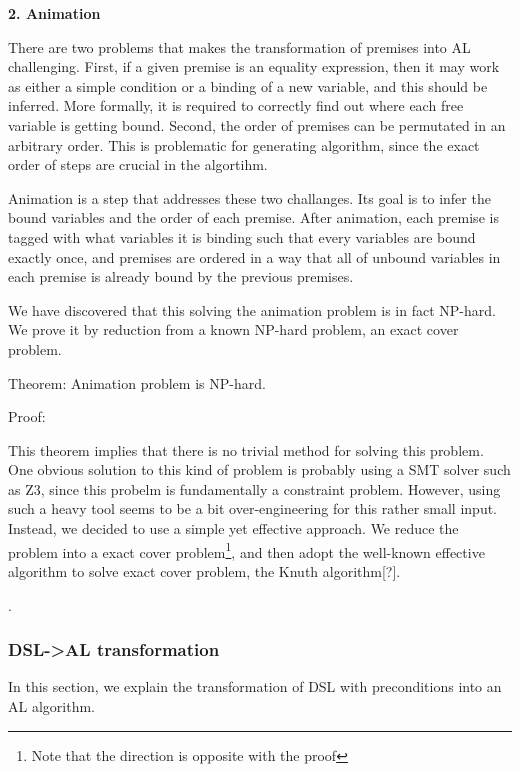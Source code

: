 

\textbf{2. Animation}

There are two problems that makes the transformation of premises into AL challenging.
First, if a given premise is an equality expression, then it may work as either a simple condition or
a binding of a new variable, and this should be inferred. More formally, it is required to
correctly find out where each free variable is getting bound. Second, the order
of premises can be permutated in an arbitrary order. This is problematic for
generating algorithm, since the exact order of steps are crucial in the algortihm.

Animation is a step that addresses these two challanges. Its goal is to infer
the bound variables and the order of each premise.
After animation, each premise is tagged with what variables it is binding
such that every variables are bound exactly once, and premises are ordered in a way that
all of unbound variables in each premise is already bound by the previous premises.

We have discovered that this solving the animation problem is in fact NP-hard.
We prove it by reduction from a known NP-hard problem, an exact cover problem.

Theorem: Animation problem is NP-hard.

Proof: 

This theorem implies that there is no trivial method for solving this problem.
One obvious solution to this kind of problem is probably using a SMT solver such as Z3, since
this probelm is fundamentally a constraint problem.
However, using such a heavy tool seems to be a bit over-engineering for this rather small input.
Instead, we decided to use a simple yet effective approach.
We reduce the problem into a exact cover problem\footnote{Note that the direction is opposite with
the proof}, and then adopt the well-known effective algorithm to solve exact cover problem,
the Knuth algorithm[?].

.


\subsubsection{DSL->AL transformation}

In this section, we explain the transformation of DSL with preconditions into an AL algorithm.

